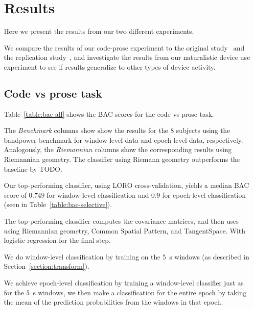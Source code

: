 \chapter{Results}\label{section:results}

    Here we present the results from our two different experiments.

    We compare the results of our code-prose experiment to the original study~\cite{floyd_decoding_2017} and the replication study~\cite{fucci_replication_2019}, and investigate the results from our naturalistic device use experiment to see if results generalize to other types of device activity.


    \section{Code vs prose task}
        Table~\ref{table:bac-all} shows the BAC scores for the code vs prose task.

        The \emph{Benchmark} columns show show the results for the 8 subjects using the bandpower benchmark for window-level data and epoch-level data, respectively. Analogously, the \emph{Riemannian} columns show the corresponding results using Riemannian geometry. The classifier using Riemann geometry outperforms the baseline by TODO.

        Our top-performing classifier, using LORO cross-validation, yields a median BAC score of $0.749$  for window-level classification and $0.9$ for epoch-level classification (seen in Table~\ref{table:bac-selective}).

        The top-performing classifier computes the covariance matrices, and then uses using Riemannian geometry, Common Spatial Pattern, and TangentSpace. With logistic regression for the final step.

        We do window-level classification by training on the \SI{5}{\second} windows (as described in Section~\ref{section:transform}).

        We achieve epoch-level classification by training a window-level classifier just as for the \SI{5}{\second} windows, we then make a classification for the entire epoch by taking the mean of the prediction probabilities from the windows in that epoch.

        
